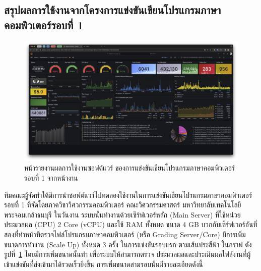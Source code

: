 \documentclass[12pt,one side,openright,a4paper]{cpe-thesis-th}
\newcommand{\thaijustify}[1]{%
  \par\hspace{30pt}\justifying
  #1
}
\begin{document}
    \subsection{สรุปผลการใช้งานจากโครงการแข่งขันเขียนโปรแกรมภาษาคอมพิวเตอร์รอบที่ 1}
        \begin{figure}[H]
            \centering
            \includegraphics[width=12cm]{figure/results/grafana/grafana-bmh1-raw.png}
            \caption[หน้ารายงานผลการใช้งานซอฟต์แวร์ ของการแข่งขันเขียนโปรแกรมภาษาคอมพิวเตอร์รอบที่ 1 ถ่ายจากหน้างาน]{หน้ารายงานผลการใช้งานซอฟต์แวร์ ของการแข่งขันเขียนโปรแกรมภาษาคอมพิวเตอร์รอบที่ 1 จากหน้างาน}
            \label{fig:res-grafana-bmh1}
        \end{figure}
        \thaijustify{
            ทีมคณะผู้จัดทำได้มีการนำซอฟต์แวร์ไปทดลองใช้งานในการแข่งขันเขียนโปรแกรมภาษาคอมพิวเตอร์รอบที่ 1 ที่จัดโดยภาควิชาวิศวกรรมคอมพิวเตอร์ คณะวิศวกรรมศาสตร์ มหาวิทยาลับเทคโนโลยีพระจอมเกล้าธนบุรี ในวันงาน ระบบนั้นทำงานด้วยเซิร์ฟเวอร์หลัก (Main Server) ที่ใช้หน่วยประมวลผล (CPU) 2 Core (vCPU) และใช้ RAM ทั้งหมด ขนาด 4 GB บวกกับเซิร์ฟเวอร์อันที่สองที่ทำหน้าที่ตรวจไฟล์โปรแกรมภาษาคอมพิวเตอร์ (หรือ Grading Server/Core) มีการเพิ่มขนาดการทำงาน (Scale Up) ทั้งหมด 3 ครั้ง ในการแข่งขันรอบแรก ตามเส้นประสีฟ้า ในกราฟ ดังรูปที่~\ref{fig:res-grafana-bmh1} โดยมีการเพิ่มขนาดนั้นทำ เพื่อระบบให้สามารถตรวจ ประมวลผลและประเมินผลไฟล์งานที่ผู้เข้าแข่งขันที่ส่งเข้ามาได้รวดเร็วยิ่งขึ้น การเพิ่มขนาดสามรอบนั้นมีรายละเอียดดังนี้
        }
\end{document}
